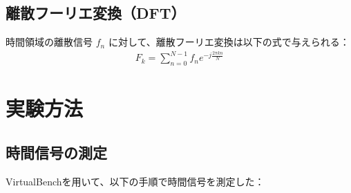 \documentclass[11pt,dvipdfmx]{jarticle}
\begin{document}
\subsection{離散フーリエ変換（DFT）}
時間領域の離散信号 $f_n$ に対して、離散フーリエ変換は以下の式で与えられる：
\begin{align}
F_k = \sum_{n=0}^{N-1} f_n e^{-j \frac{2\pi kn}{N}}
\end{align}

\section{実験方法}

\subsection{時間信号の測定}
VirtualBenchを用いて、以下の手順で時間信号を測定した：
\end{document}
